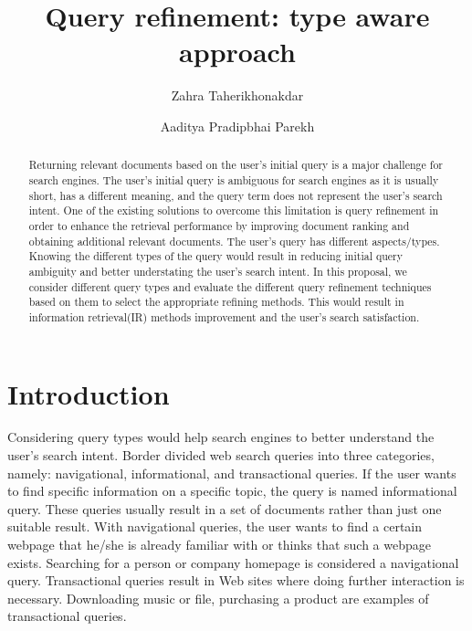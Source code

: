 \documentclass[sigconf]{acmart}
\begin{document}
\title{Query refinement: type aware approach }
\author{Zahra Taherikhonakdar}
\author{Aaditya Pradipbhai Parekh}

\begin{abstract}
Returning relevant documents based on the user's initial query is a major challenge for search engines. The user's initial query is ambiguous for search engines as it is usually short, has a different meaning, and the query term does not represent the user's search intent. One of the existing solutions to overcome this limitation is query refinement in order to enhance the retrieval performance by improving document ranking and obtaining additional relevant documents. The user's query has different aspects/types. Knowing the different types of the query would result in reducing initial query ambiguity and better understating the user's search intent. In this proposal, we consider different query types and evaluate the different query refinement techniques based on them to select the appropriate refining methods. This would result in information retrieval(IR) methods improvement and the user's search satisfaction.
\end{abstract}

\maketitle

\section{Introduction}
Considering query types would help search engines to better understand the user's search intent. Border \cite{broder2002taxonomy} divided web search queries into three categories, namely: navigational, informational, and transactional queries. If the user wants to find specific information on a specific topic, the query is named informational query. These queries usually result in a set of documents rather than just one suitable result. With navigational queries, the user wants to find a certain webpage that he/she is already familiar with or thinks that such a webpage exists. Searching for a person or company homepage is considered a navigational query. Transactional queries result in Web sites where doing further interaction is necessary. Downloading music or file, purchasing a product are examples of transactional queries.
\end{document}
